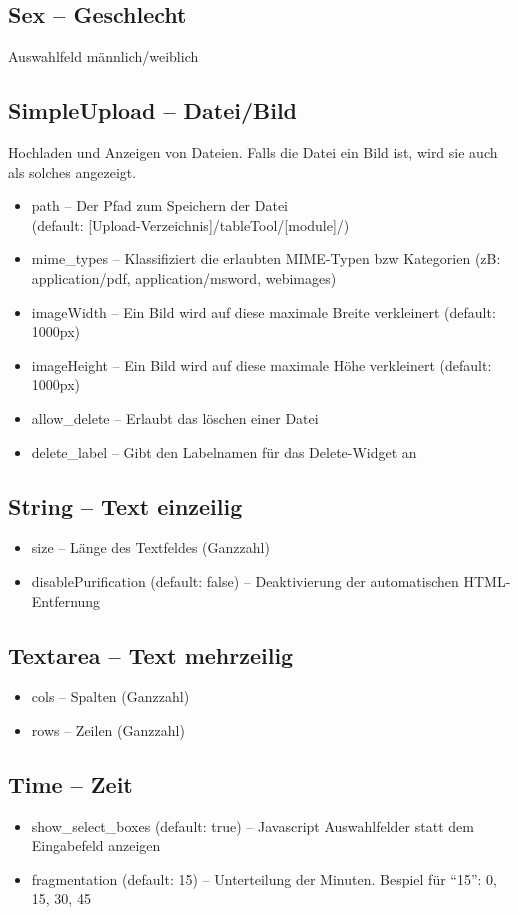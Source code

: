 \documentclass[article, a4paper, oneside, 11pt]{memoir}
\begin{document}
\subsection{Sex -- Geschlecht}
Auswahlfeld männlich/weiblich

\subsection{SimpleUpload -- Datei/Bild}
Hochladen und Anzeigen von Dateien. Falls die Datei ein Bild ist, wird sie auch als solches angezeigt.

\begin{itemize}
\item path -- Der Pfad zum Speichern der Datei\\
(default: [Upload-Verzeichnis]/tableTool/[module]/)
\item mime\_types -- Klassifiziert die erlaubten MIME-Typen bzw Kategorien (zB: application/pdf, application/msword, webimages)
\item imageWidth -- Ein Bild wird auf diese maximale Breite verkleinert (default: 1000px)
\item imageHeight -- Ein Bild wird auf diese maximale Höhe verkleinert (default: 1000px)
\item allow\_delete -- Erlaubt das löschen einer Datei
\item delete\_label -- Gibt den Labelnamen für das Delete-Widget an
\end{itemize}
\subsection{String -- Text einzeilig}
\begin{itemize}
\item size -- Länge des Textfeldes (Ganzzahl)
\item disablePurification (default: false) -- Deaktivierung der automatischen HTML-Entfernung
\end{itemize}
\subsection{Textarea -- Text mehrzeilig}
\begin{itemize}
\item cols -- Spalten (Ganzzahl)
\item rows -- Zeilen (Ganzzahl)
\end{itemize}
\subsection{Time -- Zeit}
\begin{itemize}
\item show\_select\_boxes (default: true) -- Javascript Auswahlfelder statt dem Eingabefeld anzeigen
\item fragmentation (default: 15) -- Unterteilung der Minuten. Bespiel für "`15"': 0, 15, 30, 45
\end{itemize}
\end{document}
